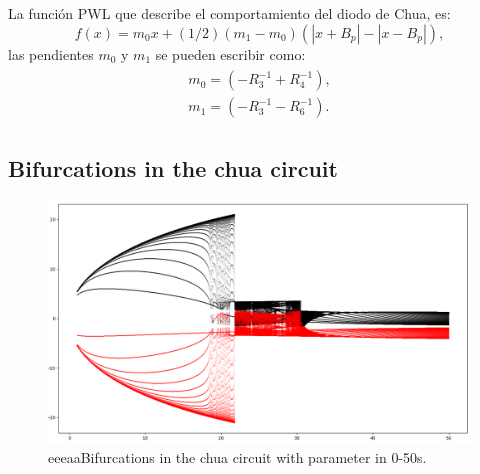 \documentclass[%
 reprint,
 amsmath,amssymb,
 aps,
]{revtex4-2}
\begin{document}
La función PWL que describe el comportamiento del diodo de Chua, es:
\begin{equation}\label{f(x) PWL}
    f(x) = m_{0}x + (1/2)(m_{1}-m_{0})(|x+B_p|-|x-B_p|),
\end{equation}
las pendientes $m_0$ y $m_1$ se pueden escribir como:
\begin{eqnarray}\label{pendientes}
    \begin{aligned}
        m_0=(-R_3^{-1} +R_4^{-1}),\\
        m_1=(-R_3^{-1} -R_6^{-1}).
    \end{aligned}
\end{eqnarray}

\subsection{Bifurcations in the chua circuit}
\begin{figure}
    \includegraphics[width=\textwidth]{Chua/0_50s_Chua.png}
    \caption{\label{fig:circuito de Chua} eeeaaBifurcations in the chua circuit with parameter in 0-50s.}
\end{figure}
\end{document}

